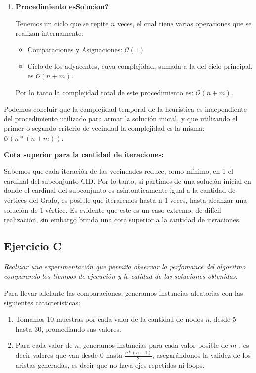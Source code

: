 \begin{enumerate}
  \item \textbf{Procedimiento esSolucion?}

    Tenemos un ciclo que se repite $n$ veces, el cual tiene varias operaciones que se realizan internamente:
  \begin{itemize}
    \item Comparaciones y Asignaciones: $\mathcal{O}(1)$
    \item Ciclo de los adyacentes, cuya complejidad, sumada a la del ciclo principal, es $\mathcal{O}(n + m)$.
  \end{itemize}
  Por lo tanto la complejidad total de este procedimiento es: $\mathcal{O}(n + m)$.

\end{enumerate}

Podemos concluir que la complejidad temporal de la heurística es independiente del procedimiento utilizado para armar la solución inicial, y que utilizando el primer o segundo criterio de vecindad la complejidad es la misma: $\mathcal{O}(n*(n + m))$.\\

\medskip

\textbf{Cota superior para la cantidad de iteraciones:}
\medskip

Sabemos que cada iteración de las vecindades reduce, como mínimo, en 1 el cardinal del subconjunto CID. Por lo tanto, si partimos de una solución inicial en donde el cardinal del subconjunto es asintonticamente igual a la cantidad de vértices del Grafo, es posible que iteraremos hasta n-1 veces, hasta alcanzar una solución de 1 vértice. Es evidente que este es un caso extremo, de difícil realización, sin embargo brinda una cota superior a la cantidad de iteraciones.

\subsection{Ejercicio C}

\textit{Realizar una experimentación que permita observar la perfomance del algoritmo comparando los tiempos de ejecución y la calidad de las soluciones obtenidas.}

\medskip

Para llevar adelante las comparaciones, generamos instancias aleatorias con las siguientes caracteristicas:
\begin{enumerate}
	\item Tomamos 10 muestras por cada valor de la cantidad de nodos $n$, desde 5 hasta 30, promediando sus valores.
    \item Para cada valor de $n$, generamos instancias para cada valor posible de $m$ , es decir valores que van desde 0 hasta $\frac{n*(n-1)}{2}$, asegurándonos la validez de los aristas generadas, es decir que no haya ejes repetidos ni loops.
\end{enumerate}

